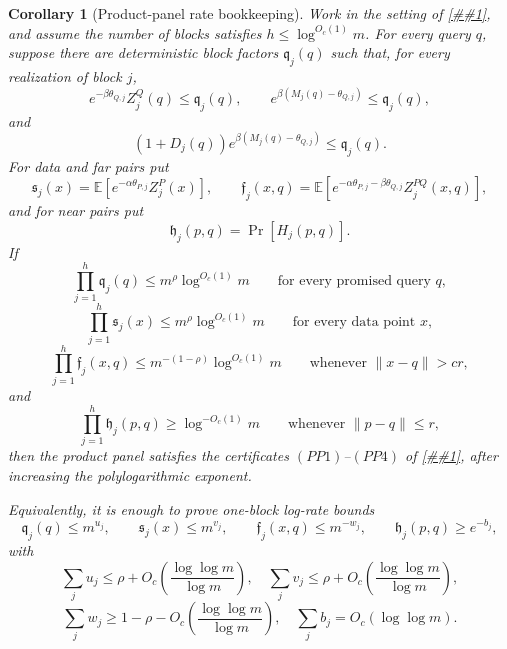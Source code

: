 \documentclass[10pt]{article}
\newcommand{\cref}[1]{\ref{##1}}
\newtheorem{corollary}[theorem]{Corollary}
\theoremstyle{definition}
\newcommand{\E}{\mathbb{E}}
\begin{document}
\begin{corollary}[Product-panel rate bookkeeping]
   \label{cor:product-panel-rate-bookkeeping}
   Work in the setting of \cref{lem:product-panel-tensorization}, and assume
   the number of blocks satisfies \(h\le\log^{O_c(1)}m\).  For every query
   \(q\), suppose there are deterministic block factors \(\mathfrak q_j(q)\)
   such that, for every realization of block \(j\),
   \[
      e^{-\beta\theta_{Q,j}}Z_j^Q(q)\le\mathfrak q_j(q),
      \qquad
      e^{\beta(M_j(q)-\theta_{Q,j})}\le\mathfrak q_j(q),
   \]
   and
   \[
      (1+D_j(q))e^{\beta(M_j(q)-\theta_{Q,j})}
      \le\mathfrak q_j(q).
   \]
   For data and far pairs put
   \[
      \mathfrak s_j(x)=
      \E\!\left[e^{-\alpha\theta_{P,j}}Z_j^P(x)\right],
      \qquad
      \mathfrak f_j(x,q)=
      \E\!\left[
      e^{-\alpha\theta_{P,j}-\beta\theta_{Q,j}}
      Z_j^{PQ}(x,q)
      \right],
   \]
   and for near pairs put
   \[
      \mathfrak h_j(p,q)=\Pr[H_j(p,q)].
   \]
   If
   \[
      \prod_{j=1}^h\mathfrak q_j(q)
      \le m^\rho\log^{O_c(1)}m
      \qquad\text{for every promised query }q,
      \tag{RB1}
   \]
   \[
      \prod_{j=1}^h\mathfrak s_j(x)
      \le m^\rho\log^{O_c(1)}m
      \qquad\text{for every data point }x,
      \tag{RB2}
   \]
   \[
      \prod_{j=1}^h\mathfrak f_j(x,q)
      \le m^{-(1-\rho)}\log^{O_c(1)}m
      \qquad
      \text{whenever }\|x-q\|>cr,
      \tag{RB3}
   \]
   and
   \[
      \prod_{j=1}^h\mathfrak h_j(p,q)
      \ge \log^{-O_c(1)}m
      \qquad
      \text{whenever }\|p-q\|\le r,
      \tag{RB4}
   \]
   then the product panel satisfies the certificates \((PP1)\)--\((PP4)\) of
   \cref{prop:product-panel-spectrum-compiler}, after increasing the
   polylogarithmic exponent.

   Equivalently, it is enough to prove one-block log-rate bounds
   \[
      \mathfrak q_j(q)\le m^{u_j},\qquad
      \mathfrak s_j(x)\le m^{v_j},\qquad
      \mathfrak f_j(x,q)\le m^{-w_j},\qquad
      \mathfrak h_j(p,q)\ge e^{-b_j},
   \]
   with
   \[
      \sum_j u_j\le\rho+O_c\!\left(\frac{\log\log m}{\log m}\right),
      \quad
      \sum_j v_j\le\rho+O_c\!\left(\frac{\log\log m}{\log m}\right),
   \]
   \[
      \sum_j w_j\ge1-\rho-O_c\!\left(\frac{\log\log m}{\log m}\right),
      \quad
      \sum_j b_j=O_c(\log\log m).
   \]
\end{corollary}
\end{document}
